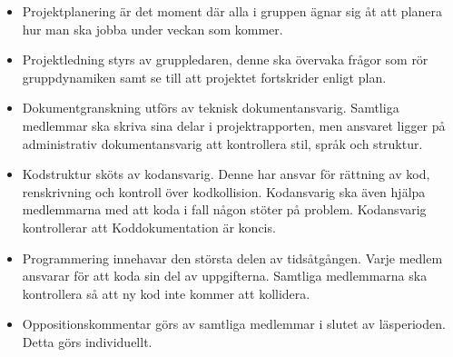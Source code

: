 \documentclass[a4paper]{article}
\begin{document}
\begin{description}
\begin{itemize}
 \item Projektplanering är det moment där alla i gruppen ägnar sig åt att planera hur man ska jobba under veckan som kommer.
 
 \item Projektledning styrs av gruppledaren, denne ska övervaka frågor som rör gruppdynamiken samt se till att projektet fortskrider enligt plan.
 
 \item Dokumentgranskning utförs av teknisk dokumentansvarig. Samtliga medlemmar ska skriva sina delar i projektrapporten, men ansvaret ligger på administrativ dokumentansvarig att kontrollera stil, språk och struktur.
 
 \item Kodstruktur sköts av kodansvarig. Denne har ansvar för rättning av kod, renskrivning och kontroll över kodkollision. Kodansvarig ska även hjälpa medlemmarna med att koda i fall någon stöter på problem. Kodansvarig kontrollerar att Koddokumentation är koncis.
 
 \item Programmering innehavar den största delen av tidsåtgången. Varje medlem ansvarar för att koda sin del av uppgifterna. Samtliga medlemmarna ska kontrollera så att ny kod inte kommer att kollidera.

 \item Oppositionskommentar görs av samtliga medlemmar i slutet av läsperioden. Detta görs individuellt.
\end{itemize}
\end{description}
\end{document}
